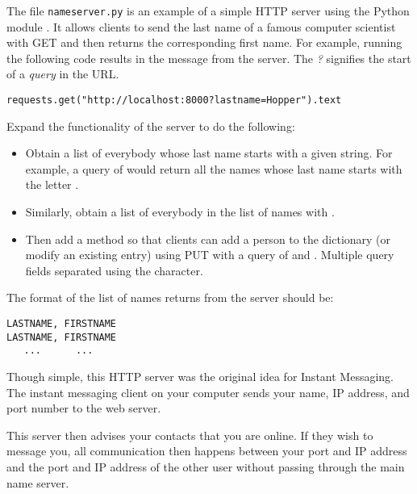 \begin{problem}
The file \texttt{nameserver.py} is an example of a simple HTTP server using the Python module .
It allows clients to send the last name of a famous computer scientist with GET and then returns the corresponding first name.
For example, running the following code results in the message  from the server.
The \emph{?} signifies the start of a \emph{query} in the URL.

\begin{lstlisting}
requests.get("http://localhost:8000?lastname=Hopper").text
\end{lstlisting}

Expand the functionality of the server to do the following:
\begin{itemize}
\item Obtain a list of everybody whose last name starts with a given string. For example, a query of  would return all the names whose last name starts with the letter .
\item Similarly, obtain a list of everybody in the list of names with .
\item Then add a method  so that clients can add a person to the dictionary (or modify an existing entry) using PUT with a query of  and . Multiple query fields separated using the  character.
\end{itemize}
The format of the list of names returns from the server should be:
\begin{lstlisting}
LASTNAME, FIRSTNAME
LASTNAME, FIRSTNAME
   ...      ...
\end{lstlisting}

\end{problem}

Though simple, this HTTP server was the original idea for Instant Messaging.
The instant messaging client on your computer sends your name, IP address, and port number to the web server.

This server then advises your contacts that you are online.
If they wish to message you, all communication then happens between your port and IP address and the port and IP address of the other user without passing through the main name server.

